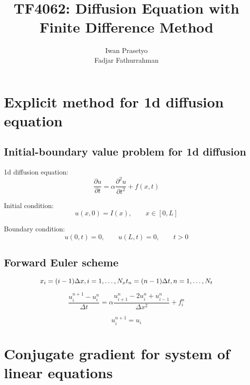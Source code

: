 \documentclass[a4paper]{article}
\begin{document}
\title{TF4062: Diffusion Equation with Finite Difference Method}
\author{Iwan Prasetyo \\
Fadjar Fathurrahman}
\date{}
\maketitle


\section{Explicit method for 1d diffusion equation}


\subsection{Initial-boundary value problem for 1d diffusion}

1d diffusion equation:
\begin{equation}
\frac{\partial u}{\partial t} = \alpha \frac{\partial^2 u}{\partial t^2} + f(x,t)
\end{equation}

Initial condition:
\begin{equation}
u(x,0) = I(x), \qquad x \in [0,L]
\end{equation}

Boundary condition:
\begin{equation}
u(0,t) = 0, \qquad u(L,t) = 0, \qquad t > 0
\end{equation}


\subsection{Forward Euler scheme}

\begin{equation}
x_{i} = (i-1)\Delta x, i = 1, \ldots, N_{x} \\
t_{n} = (n-1)\Delta t, n = 1, \ldots, N_{t}
\end{equation}

\begin{equation}
\frac{u_{i}^{n+1} - u_{i}^{n}}{\Delta t} = \alpha \frac{u_{i+1}^{n} -2u_{i}^{n} + u_{i-1}^{n}}{\Delta x^2} + f_{i}^{n}
\end{equation}

\begin{equation}
u_{i}^{n+1} = u_{i}
\end{equation}


\appendix

\appendixpage

\section{Conjugate gradient for system of linear equations}




\end{document}
